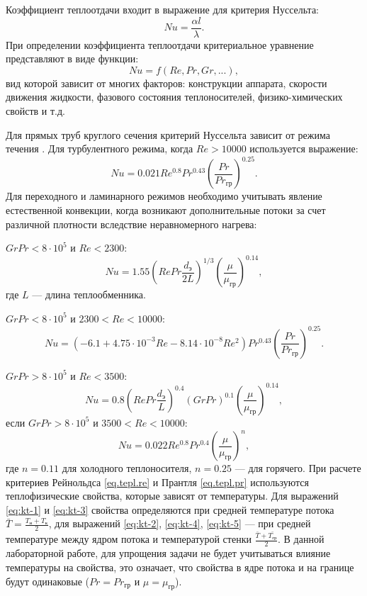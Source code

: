 Коэффициент теплоотдачи входит в выражение для критерия Нуссельта: 
\begin{equation} \label{eq.tepl.nu}
	Nu=\dfrac{\alpha l}{\lambda}.
\end{equation}
При определении коэффициента теплоотдачи критериальное уравнение представляют в виде функции:
\begin{equation}
	Nu= f (Re, Pr, Gr, ...),
\end{equation}
вид которой зависит от многих факторов: конструкции аппарата, скорости движения жидкости, фазового состояния теплоносителей, физико-химических свойств и т.д. 

Для прямых труб круглого сечения критерий Нуссельта зависит от режима течения \cite{posobie}. Для турбулентного режима, когда $Re>10000$ используется выражение:
\begin{equation} \label{eq:kt-1}
	Nu=0.021 Re^{0.8} Pr^{0.43} \left( \dfrac{Pr}{Pr_{гр}} \right) ^{0.25} .
\end{equation}
Для переходного и ламинарного режимов необходимо учитывать явление естественной конвекции, когда возникают дополнительные потоки за счет различной плотности вследствие неравномерного нагрева:

$Gr Pr < 8 \cdot 10^5$ и $Re < 2300 $:
\begin{equation} \label{eq:kt-2}
	Nu=1.55 \left(  Re Pr \dfrac{d_э}{2L}\right) ^ {1/3} \left( \dfrac{\mu}{\mu_{гр}} \right) ^{0.14},
\end{equation}
где $L$ --- длина теплообменника.

 $Gr Pr < 8 \cdot 10^5$ и $2300 <Re < 10000 $:
\begin{equation} \label{eq:kt-3}
	Nu=(-6.1 +4.75 \cdot 10^{-3} Re -8.14\cdot 10^{-8} Re^2) Pr^{0.43} \left( \dfrac{Pr}{Pr_{гр}} \right) ^{0.25}.
\end{equation}

$Gr Pr > 8 \cdot 10^5$ и $Re < 3500 $:
\begin{equation} \label{eq:kt-4}
Nu=0.8 \left( Re Pr \dfrac{d_э}{L}\right) ^{0.4} (Gr Pr)^{0.1} \left( \dfrac{\mu}{\mu_{гр}} \right) ^{0.14},
\end{equation}
если $Gr Pr > 8 \cdot 10^5$ и $3500 <Re < 10000 $:
\begin{equation} \label{eq:kt-5}
Nu=0.022 Re^{0.8} Pr^{0.4} \left( \dfrac{\mu}{\mu_{гр}} \right) ^{n},
\end{equation}
где $n = 0.11$ для холодного теплоносителя, $n = 0.25$ --- для горячего. При расчете критериев Рейнольдса \eqref{eq.tepl.re}  и Прантля \eqref{eq.tepl.pr} используются теплофизические свойства, которые зависят от температуры. Для выражений \eqref{eq:kt-1} и \eqref{eq:kt-3} свойства определяются при средней температуре потока $\bar{T} = \frac{T_н + T_к}{2}$, для выражений \eqref{eq:kt-2}, \eqref{eq:kt-4}, \eqref{eq:kt-5} --- при средней температуре между ядром потока и температурой стенки $\frac{\bar{T} + \bar{T_{гр}}}{2}$. В данной лабораторной работе, для упрощения задачи не будет учитываться влияние температуры на свойства, это означает, что свойства в ядре потока и на границе будут одинаковые ($Pr=Pr_{гр}$ и $\mu = \mu_{гр}$).

